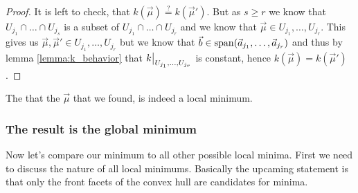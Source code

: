 \begin{proof}
    It is left to check, that $k(\vec\mu) \stackrel{?}{=} k(\vec\mu')$. But as $s \geq r$ we know that $U_{j_1} \cap \dots \cap U_{j_s}$ is a subset of $U_{j_1} \cap \dots \cap U_{j_r}$ and we know that $\vec\mu \in U_{j_1}, \dots, U_{j_r}$. This gives us $\vec\mu, \vec\mu' \in U_{j_1}, \dots, U_{j_r}$ but we know that $\vec b \in \operatorname{span}(\vec a_{j_1}, \dots, \vec a_{j_r})$ and thus by lemma \ref{lemma:k_behavior} that $\restrict{k}{U_{j_1}, \dots, U_{j_r}}$ is constant, hence $k(\vec\mu) = k(\vec\mu')$.
\end{proof}

The that the $\vec\mu$ that we found, is indeed a local minimum.

\subsubsection{The result is the global minimum}
Now let's compare our minimum to all other possible local minima. First we need to discuss the nature of all local minimums. Basically the upcaming statement is that only the front facets of the convex hull are candidates for minima.

